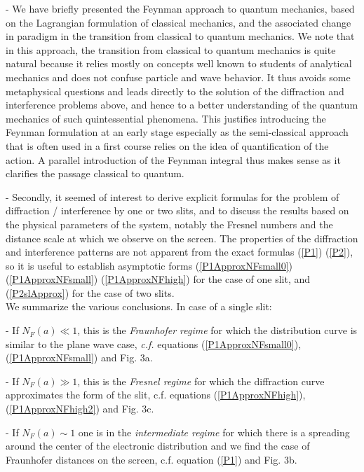 \documentclass[12pt]{article}   %
\begin{document}
- We have briefly presented the Feynman approach to quantum
mechanics, based on the Lagrangian formulation of classical
mechanics, and the associated change in paradigm in the transition
from classical to quantum mechanics. We note that in this
approach, the transition from classical to quantum mechanics is
quite natural because it relies mostly on concepts well known to
students of analytical mechanics and does not confuse particle and
wave behavior. It thus avoids some metaphysical questions and
leads directly to the solution of the diffraction and interference
problems above, and hence to a better understanding of the quantum
mechanics of such quintessential phenomena. This justifies
introducing the Feynman formulation at an early stage especially
as the semi-classical approach that is often used in a first
course relies on the idea of  quantification of the action. A
parallel introduction of the Feynman integral thus makes sense as
it clarifies the passage classical to quantum.

 - Secondly, it seemed of interest to derive explicit formulas for the problem
of diffraction / interference by one or two slits, and to discuss
the results based on the physical parameters of the system,
notably the Fresnel numbers and the distance scale at which we
observe on the screen. The properties of the diffraction and
interference patterns are not apparent from the exact formulas
(\ref{P1}) (\ref{P2}), so it is useful to establish asymptotic
forms (\ref{P1ApproxNFsmall0}) (\ref{P1ApproxNFsmall})
(\ref{P1ApproxNFhigh}) for the case of
one slit, and (\ref{P2slApprox}) for the case of two slits.\\

We summarize the various conclusions. In case of a single slit:

 - If $N_F(a)\ll 1$, this is the \textit{Fraunhofer regime} for which the distribution
curve is similar to the plane wave case, \textit{c.f.} equations
(\ref{P1ApproxNFsmall0}), (\ref{P1ApproxNFsmall}) and Fig. 3a.

 - If $N_F(a)\gg1$, this is the \textit{Fresnel regime} for which the diffraction
curve approximates the form of the slit, c.f. equations
(\ref{P1ApproxNFhigh}), (\ref{P1ApproxNFhigh2}) and Fig. 3c.

 - If $N_F(a)\sim 1$ one is in the \textit{intermediate regime} for which there is
a spreading around the center of the electronic distribution and
we find the case of Fraunhofer distances on the
screen, c.f. equation (\ref{P1}) and Fig. 3b. \\
\end{document}
